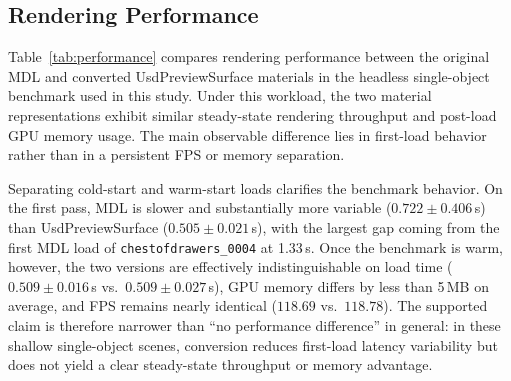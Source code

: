 \subsection{Rendering Performance}
\label{sec:perf}

Table~\ref{tab:performance} compares rendering performance between the original
MDL and converted UsdPreviewSurface materials in the headless single-object
benchmark used in this study. Under this workload, the two material
representations exhibit similar steady-state rendering throughput and post-load
GPU memory usage. The main observable difference lies in first-load behavior
rather than in a persistent FPS or memory separation.

\begin{table}[t]
\centering
\caption{Rendering performance comparison for the headless single-object
benchmark in this study. Cold-start load is computed from the first run for
each scene; warm load is computed from runs 2--3. Load time is measured from
\texttt{open\_stage} through a fixed 30-update warm-up window.}
\label{tab:performance}
\end{table}

Separating cold-start and warm-start loads clarifies the benchmark behavior.
On the first pass, MDL is slower and substantially more variable
($0.722 \pm 0.406$\,s) than UsdPreviewSurface ($0.505 \pm 0.021$\,s), with the
largest gap coming from the first MDL load of
\texttt{chestofdrawers\_0004} at 1.33\,s. Once the benchmark is warm, however,
the two versions are effectively indistinguishable on load time
($0.509 \pm 0.016$\,s vs.\ $0.509 \pm 0.027$\,s), GPU memory differs by less
than 5\,MB on average, and FPS remains nearly identical ($118.69$ vs.\
$118.78$). The supported claim is therefore narrower than ``no performance
difference'' in general: in these shallow single-object scenes, conversion
reduces first-load latency variability but does not yield a clear steady-state
throughput or memory advantage.

